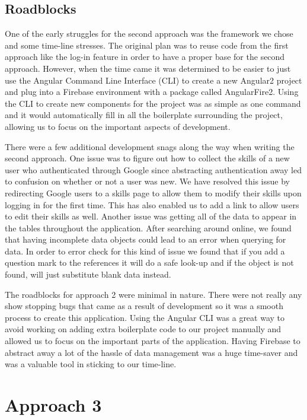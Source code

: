 \documentclass[conference]{IEEEtran}
\begin{document}
\subsection{Roadblocks}

One of the early struggles for the second approach was the framework we chose and some time-line stresses. The original plan was to reuse code from the first approach like the log-in feature in order to have a proper base for the second approach. However, when the time came it was determined to be easier to just use the Angular Command Line Interface (CLI) to create a new Angular2 project and plug into a Firebase environment with a package called AngularFire2. Using the CLI to create new components for the project was as simple as one command and it would automatically fill in all the boilerplate surrounding the project, allowing us to focus on the important aspects of development. 

There were a few additional development snags along the way when writing the second approach. One issue was to figure out how to collect the skills of a new user who authenticated through Google since abstracting authentication away led to confusion on whether or not a user was new. We have resolved this issue by redirecting Google users to a skills page to allow them to modify their skills upon logging in for the first time. This has also enabled us to add a link to allow users to edit their skills as well. Another issue was getting all of the data to appear in the tables throughout the application. After searching around online, we found that having incomplete data objects could lead to an error when querying for data. In order to error check for this kind of issue we found that if you add a question mark to the references it will do a safe look-up and if the object is not found, will just substitute blank data instead. 

The roadblocks for approach 2 were minimal in nature. There were not really any show stopping bugs that came as a result of development so it was a smooth process to create this application. Using the Angular CLI was a great way to avoid working on adding extra boilerplate code to our project manually and allowed us to focus on the important parts of the application. Having Firebase to abstract away a lot of the hassle of data management was a huge time-saver and was a valuable tool in sticking to our time-line. 

\section{Approach 3}
\blindtext
\end{document}
